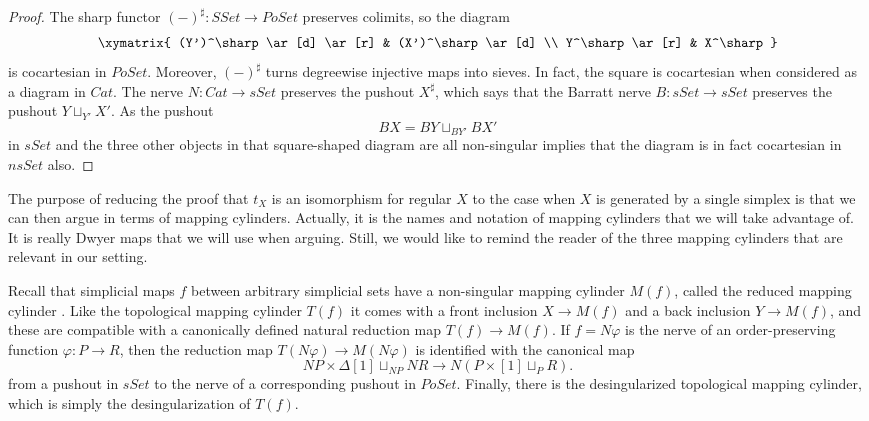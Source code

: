 \begin{proof}
The sharp functor $(-)^\sharp :SSet\to PoSet$ preserves colimits, so the diagram
\begin{displaymath}
\xymatrix{
(Y')^\sharp \ar[d] \ar[r] & (X')^\sharp \ar[d] \\
Y^\sharp \ar[r] & X^\sharp
}
\end{displaymath}
is cocartesian in $PoSet$. Moreover, $(-)^\sharp$ turns degreewise injective maps into sieves. In fact, the square is cocartesian when considered as a diagram in $Cat$. The nerve $N:Cat\to sSet$ preserves the pushout $X^\sharp$, which says that the Barratt nerve $B:sSet\to sSet$ preserves the pushout $Y\sqcup _{Y'}X'$. As the pushout
\[BX=BY\sqcup _{BY'}BX'\]
in $sSet$ and the three other objects in that square-shaped diagram are all non-singular implies that the diagram is in fact cocartesian in $nsSet$ also.
\end{proof}
\noindent The purpose of reducing the proof that $t_X$ is an isomorphism for regular $X$ to the case when $X$ is generated by a single simplex is that we can then argue in terms of mapping cylinders. Actually, it is the names and notation of mapping cylinders that we will take advantage of. It is really Dwyer maps that we will use when arguing. Still, we would like to remind the reader of the three mapping cylinders that are relevant in our setting.

Recall that simplicial maps $f$ between arbitrary simplicial sets have a non-singular mapping cylinder $M(f)$, called the reduced mapping cylinder \cite{WJR13}. Like the topological mapping cylinder $T(f)$ it comes with a front inclusion $X\to M(f)$ and a back inclusion $Y\to M(f)$, and these are compatible with a canonically defined natural reduction map $T(f)\to M(f)$. If $f=N\varphi$ is the nerve of an order-preserving function $\varphi :P\to R$, then the reduction map $T(N\varphi )\to M(N\varphi )$ is identified with the canonical map
\[NP\times \Delta [1]\sqcup _{NP}NR\to N(P\times [1]\sqcup _PR).\]
from a pushout in $sSet$ to the nerve of a corresponding pushout in $PoSet$. Finally, there is the desingularized topological mapping cylinder, which is simply the desingularization of $T(f)$.

